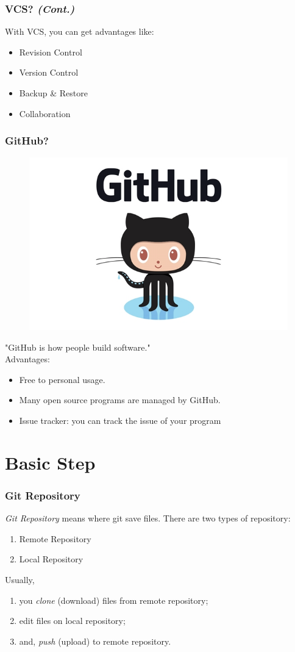 \documentclass[aspectratio=169]{beamer}
\begin{document}
	\begin{frame}
		\frametitle{VCS? \textit{(Cont.)}}
		
		With VCS, you can get advantages like:
		\begin{itemize}
			\item Revision Control
			\item Version Control
			\item Backup \& Restore
			\item Collaboration
		\end{itemize}
	\end{frame}

	\begin{frame}
		\frametitle{GitHub?}
		
		\begin{figure}
			\centering
			\includegraphics[width=0.3 \linewidth]{figures/github.jpg}
		\end{figure}
		"GitHub is how people build software." \\
		Advantages:
		\begin{itemize}
			\item Free to personal usage. 
			\item Many open source programs are managed by GitHub.
			\item Issue tracker: you can track the issue of your program
		\end{itemize}
	\end{frame}

	\section{Basic Step}
	\begin{frame}
		\frametitle{Git Repository}
		
		\textit{Git Repository} means where git save files. There are two types of repository:
		\begin{enumerate}
			\item Remote Repository
			\item Local Repository
		\end{enumerate}
	
		Usually, 
		\begin{enumerate}
			\item you \textit{clone} (download) files from remote repository;
			\item edit files on local repository;
			\item and, \textit{push} (upload) to remote repository.
		\end{enumerate}
	\end{frame}
\end{document}
